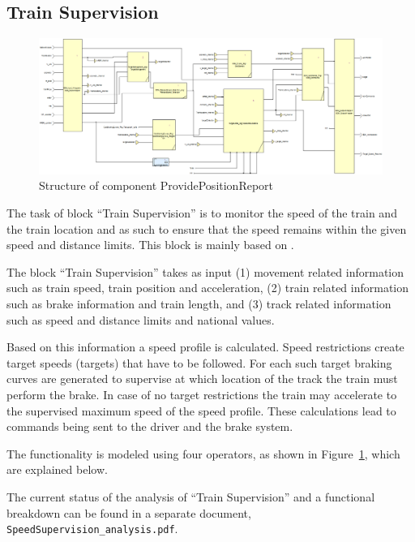 \subsection{Train Supervision}

\begin{figure}[!h]
\centering
\includegraphics[width=0.95\textheight, angle=90]{../images/speedsupervision.PNG}
\caption{Structure of component ProvidePositionReport}\label{fig:ssv}
\end{figure}

The task of block ``Train Supervision'' is to monitor the speed of the train and the train location and as such to ensure that the speed remains within the given speed and distance limits. This block is mainly based on \cite[Chapt.~3.13]{subset-026}.

The block ``Train Supervision'' takes as input (1) movement related information such as train speed, train position and acceleration, (2) train related information such as brake information and train length, and (3) track related information such as speed and distance limits and national values.

Based on this information a speed profile is calculated. Speed restrictions create target speeds (targets) that have to be followed. For each such target braking curves are generated to supervise at which location of the track the train must perform the brake. In case of no target restrictions the train may accelerate to the supervised maximum speed of the speed profile. These calculations lead to commands being sent to the driver and the brake system.

The functionality is modeled using four operators, as shown in Figure~\ref{fig:ssv}, which are explained below.

The current status of the analysis of ``Train Supervision'' and a functional breakdown can be found in a separate document, \verb+SpeedSupervision_analysis.pdf+.



